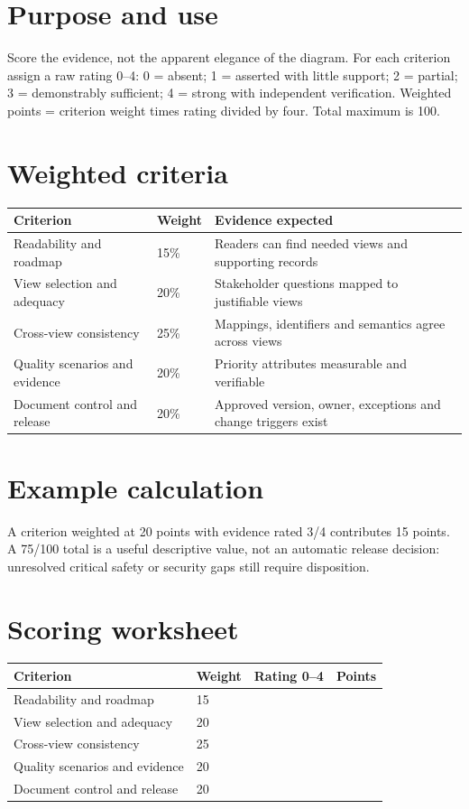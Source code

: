 \documentclass[10pt,letterpaper]{article}
\begin{document}
\DocProvenance
\section{Purpose and use}
Score the evidence, not the apparent elegance of the diagram. For each criterion assign a raw rating 0--4: 0 = absent; 1 = asserted with little support; 2 = partial; 3 = demonstrably sufficient; 4 = strong with independent verification. Weighted points = criterion weight times rating divided by four. Total maximum is 100.

\section{Weighted criteria}
\small
\begin{tabularx}{\linewidth}{@{}YYY@{}}
\toprule
\textbf{Criterion} & \textbf{Weight} & \textbf{Evidence expected} \\
\midrule
Readability and roadmap & 15\% & Readers can find needed views and supporting records \\
View selection and adequacy & 20\% & Stakeholder questions mapped to justifiable views \\
Cross-view consistency & 25\% & Mappings, identifiers and semantics agree across views \\
Quality scenarios and evidence & 20\% & Priority attributes measurable and verifiable \\
Document control and release & 20\% & Approved version, owner, exceptions and change triggers exist \\
\bottomrule
\end{tabularx}
\normalsize
\section{Example calculation}
A criterion weighted at 20 points with evidence rated 3/4 contributes 15 points. A 75/100 total is a useful descriptive value, not an automatic release decision: unresolved critical safety or security gaps still require disposition.

\section{Scoring worksheet}
\small
\begin{tabularx}{\linewidth}{@{}YYYY@{}}
\toprule
\textbf{Criterion} & \textbf{Weight} & \textbf{Rating 0--4} & \textbf{Points} \\
\midrule
Readability and roadmap & 15 &  &  \\
View selection and adequacy & 20 &  &  \\
Cross-view consistency & 25 &  &  \\
Quality scenarios and evidence & 20 &  &  \\
Document control and release & 20 &  &  \\
\bottomrule
\end{tabularx}
\normalsize
\end{document}

